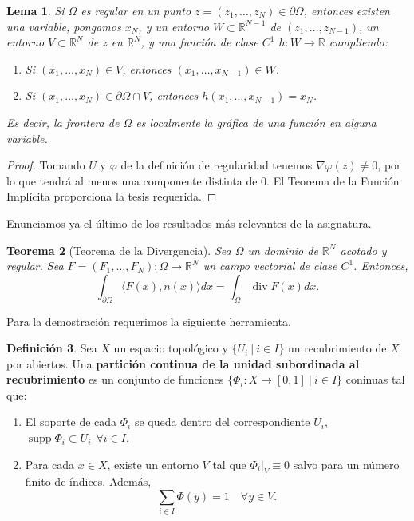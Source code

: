 \documentclass[12pt,spanish]{article}
\newtheorem{theorem}{Teorema}[section]
\newtheorem{lemma}[theorem]{Lema}
\theoremstyle{definition}
\newtheorem{definition}[theorem]{Definici\'on}
\theoremstyle{remark}
\begin{document}
\begin{lemma}
	Si $\Omega$ es regular en un punto $z=(z_1,\ldots,z_N)\in\partial\Omega$, entonces existen una variable, pongamos $x_N$, y un entorno $W\subset\mathbb{R}^{N-1}$ de $(z_1,\ldots,z_{N-1})$, un entorno $V\subset\mathbb{R}^N$ de $z$ en $\mathbb{R}^N$, y una función de clase $C^1$ $h:W\rightarrow \mathbb{R}$ cumpliendo:
	\begin{enumerate}[$(a)$]
		\item Si $(x_1,\ldots,x_N)\in V$, entonces $(x_1,\ldots,x_{N-1})\in W$.
		\item Si $(x_1,\ldots,x_N)\in \partial\Omega\cap V$, entonces $h(x_1,\ldots,x_{N-1})=x_N$.
	\end{enumerate}
Es decir, la frontera de $\Omega$ es localmente la gráfica de una función en alguna variable.
\end{lemma}

\begin{proof}
	Tomando $U$ y $\varphi$ de la definición de regularidad tenemos $\nabla\varphi(z)\neq 0$, por lo que tendrá al menos una componente distinta de 0. El Teorema de la Función Implícita proporciona la tesis requerida.
\end{proof}

Enunciamos ya el último de los resultados más relevantes de la asignatura.

\begin{theorem}[Teorema de la Divergencia]
	Sea $\Omega$ un dominio de $\mathbb{R}^N$ acotado y regular. Sea $F=(F_1,\ldots,F_N):\overline{\Omega}\rightarrow\mathbb{R}^N$ un campo vectorial de clase $C^1$.
	Entonces,
	\[\int_{\partial\Omega}\langle F(x),n(x)\rangle dx=\int_\Omega \operatorname{div}F(x)dx.\]
\end{theorem}

Para la demostración requerimos la siguiente herramienta.

\begin{definition}
	Sea $X$ un espacio topológico y $\{U_i \ | \ i \in I\}$ un recubrimiento de $X$ por abiertos. Una \textbf{partición continua de la unidad subordinada al recubrimiento} es un conjunto de funciones $\{\Phi_i:X\rightarrow[0,1] \ | \ i\in I\}$ coninuas tal que:
	\begin{enumerate}[$(a)$]
		\item El soporte de cada $\Phi_i$ se queda dentro del correspondiente $U_i$, $\operatorname{supp}\Phi_i\subset U_i\ \ \forall i\in I$.
		\item Para cada $x\in X$, existe un entorno $V$ tal que $\Phi_i|_V\equiv 0$ salvo para un número finito de índices. Además, \[
		\sum_{i\in I}\Phi(y)=1\quad\forall y\in V.\]
	\end{enumerate}
\end{definition}
\end{document}
